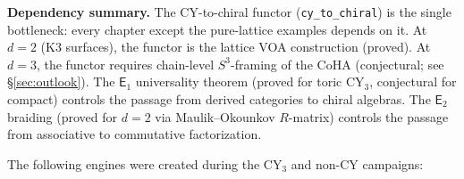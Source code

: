 \documentclass[11pt]{article}
\newcommand{\Eone}{\mathsf{E}_1}
\newcommand{\Etwo}{\mathsf{E}_2}
\begin{document}
\medskip
\noindent\textbf{Dependency summary.}
The CY-to-chiral functor (\texttt{cy\_to\_chiral}) is the single bottleneck:
every chapter except the pure-lattice examples depends on it.
At $d = 2$ (K3 surfaces), the functor is the lattice VOA construction
(proved). At $d = 3$, the functor requires chain-level $S^3$-framing
of the CoHA (conjectural; see \S\ref{sec:outlook}).
The $\Eone$ universality theorem (proved for toric CY$_3$, conjectural
for compact) controls the passage from derived categories to chiral algebras.
The $\Etwo$ braiding (proved for $d = 2$ via Maulik--Okounkov $R$-matrix)
controls the passage from associative to commutative factorization.



The following engines were created during the CY$_3$ and non-CY campaigns:
\end{document}
